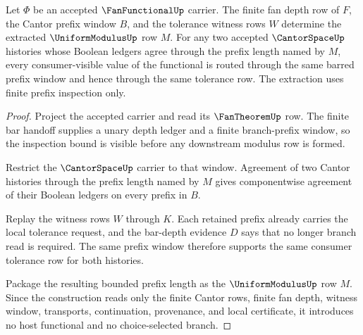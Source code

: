 \begin{theorem}
\label{thm:fan-functional-uniform-modulus-extraction}
Let $\Phi$ be an accepted $\FanFunctionalUp$ carrier. The finite fan depth row
of $F$, the Cantor prefix window $B$, and the tolerance witness rows $W$
determine the extracted $\UniformModulusUp$ row $M$. For any two accepted
$\CantorSpaceUp$ histories whose Boolean ledgers agree through the prefix
length named by $M$, every consumer-visible value of the functional is routed
through the same barred prefix window and hence through the same tolerance
row. The extraction uses finite prefix inspection only.
\end{theorem}
\begin{proof}
Project the accepted carrier and read its $\FanTheoremUp$ row. The finite bar
handoff supplies a unary depth ledger and a finite branch-prefix window, so the
inspection bound is visible before any downstream modulus row is formed.

Restrict the $\CantorSpaceUp$ carrier to that window. Agreement of two Cantor
histories through the prefix length named by $M$ gives componentwise agreement
of their Boolean ledgers on every prefix in $B$.

Replay the witness rows $W$ through $K$. Each retained prefix already carries
the local tolerance request, and the bar-depth evidence $D$ says that no longer
branch read is required. The same prefix window therefore supports the same
consumer tolerance row for both histories.

Package the resulting bounded prefix length as the $\UniformModulusUp$ row
$M$. Since the construction reads only the finite Cantor rows, finite fan
depth, witness window, transports, continuation, provenance, and local
certificate, it introduces no host functional and no choice-selected branch.
\end{proof}

